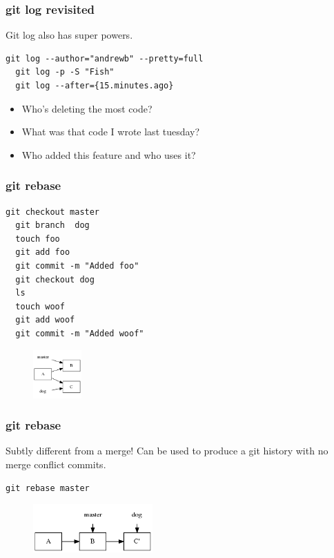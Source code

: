 \documentclass{beamer}
\begin{document}
\begin{frame}[fragile]

\frametitle{git log revisited}

Git log also has super powers.

\vspace{1em}

\begin{lstlisting}[frame=single]
  git log --author="andrewb" --pretty=full   
  git log -p -S "Fish"
  git log --after={15.minutes.ago}
\end{lstlisting}

\begin{itemize}
  \item{Who's deleting the most code?}
  \item{What was that code I wrote last tuesday?}
  \item{Who added this feature and who uses it?}
\end{itemize}
    
\end{frame}

\begin{frame}[fragile]
\frametitle{git rebase}

\begin{lstlisting}[frame=single]
  git checkout master
  git branch  dog
  touch foo
  git add foo
  git commit -m "Added foo"
  git checkout dog
  ls
  touch woof
  git add woof
  git commit -m "Added woof"
\end{lstlisting}

\begin{figure}[p]
  \centering
  \includegraphics[height=5em]{dog.png}
\end{figure}

\end{frame}

\begin{frame}[fragile]
\frametitle{git rebase}

Subtly different from a merge! Can be used to produce a git history with no merge conflict commits.

\vspace{1em}

\begin{lstlisting}[frame=single]
  git rebase master
\end{lstlisting}

\begin{figure}[p]
  \centering
  \includegraphics[height=5em]{rebase.png}
\end{figure}

\end{frame}
\end{document}

